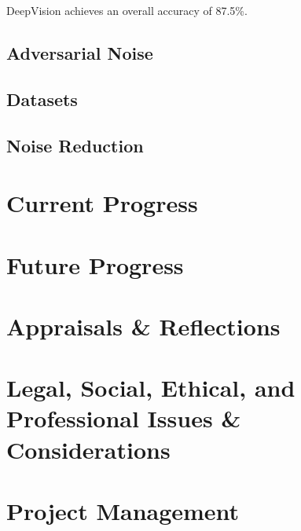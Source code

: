 \documentclass{article}
\begin{document}
DeepVision achieves an overall accuracy of 87.5\%\cite{blinking-pattern}.

\subsection{Adversarial Noise}
\subsection{Datasets}
\subsection{Noise Reduction}

\section{Current Progress}

\section{Future Progress}

\section{Appraisals \& Reflections}

\section{Legal, Social, Ethical, and Professional Issues \& Considerations}

\section{Project Management}



\end{document}
